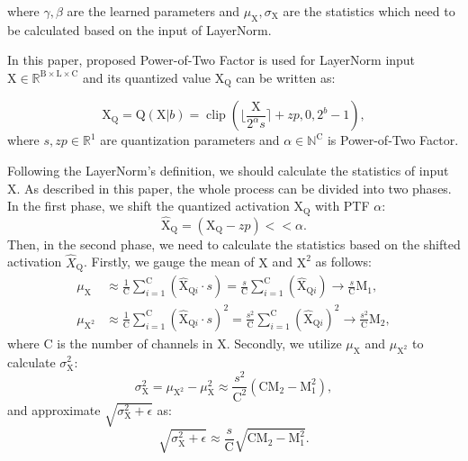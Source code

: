 \documentclass{article}
\begin{document}
where $\gamma, \beta$ are the learned parameters and $\mu_\textrm{X},\sigma_\textrm{X}$ are the statistics which need to be calculated based on the input of LayerNorm.


In this paper, proposed Power-of-Two Factor is used for LayerNorm input $\textrm{X}\in \mathds{R}^{\textrm{B}\times \textrm{L}\times \textrm{C}}$ and its quantized value $\textrm{X}_\textrm{Q}$ can be written as:

\begin{equation}
    \textrm{X}_\textrm{Q}=\textrm{Q}(\textrm{X}|b)=\operatorname{clip}(\lfloor\frac{\textrm{X}}{\textrm{2}^{\alpha}s}\rceil+zp, \textrm{0},\textrm{2}^{b}-1),
\end{equation}
where $s,zp\in \mathds{R}^\textrm{1}$ are quantization parameters and $\alpha \in \mathds{N}^\textrm{C}$ is Power-of-Two Factor.

Following the LayerNorm's definition, we should calculate the statistics of input $\textrm{X}$. As described in this paper, the whole process can be divided into two phases. In the first phase, we shift the quantized activation $\textrm{X}_\textrm{Q}$ with PTF $\alpha$:
\begin{equation}
    \widehat{\textrm{X}}_\textrm{Q}=(\textrm{X}_\textrm{Q}-zp)<<\alpha.
\end{equation}
Then, in the second phase, we need to calculate the statistics based on the shifted activation $\widehat{X}_\textrm{Q}$. Firstly, we gauge the mean of $\textrm{X}$ and $\textrm{X}^\textrm{2}$ as follows:
\begin{align}
    \mu_\textrm{X}&\approx\frac{1}{\textrm{C}}\sum_{i=1}^{\textrm{C}}(\widehat{\textrm{X}}_{\textrm{Q}i}\cdot s)=\frac{s}{\textrm{C}}\sum_{i=1}^{\textrm{C}}(\widehat{\textrm{X}}_{\textrm{Q}i})\rightarrow\frac{s}{\textrm{C}}\textrm{M}_1,\\
    \mu_{\textrm{X}^2}&\approx\frac{1}{\textrm{C}}\sum_{i=1}^{\textrm{C}}(\widehat{\textrm{X}}_{\textrm{Q}i}\cdot s)^2=\frac{s^2}{\textrm{C}}\sum_{i=1}^{\textrm{C}}(\widehat{\textrm{X}}_{\textrm{Q}i})^2\rightarrow\frac{s^2}{\textrm{C}}\textrm{M}_2,
\end{align}
where $\textrm{C}$ is the number of channels in $\textrm{X}$.
Secondly, we utilize $\mu_\textrm{X}$ and $ \mu_{\textrm{X}^2}$ to calculate $\sigma_\textrm{X}^2$:
\begin{equation}
    \sigma_\textrm{X}^2=\mu_{\textrm{X}^2} -\mu_{\textrm{X}}^2\approx \frac{s^2}{\textrm{C}^2}(\textrm{C}\textrm{M}_2-\textrm{M}_1^2),
\end{equation}
and approximate $\sqrt{\sigma_\textrm{X}^2+\epsilon}$ as:
\begin{equation}
    \sqrt{\sigma_\textrm{X}^2+\epsilon}\approx  \frac{s}{\textrm{C}}\sqrt{\textrm{C}\textrm{M}_2-\textrm{M}_1^2}.
\end{equation}
\end{document}
